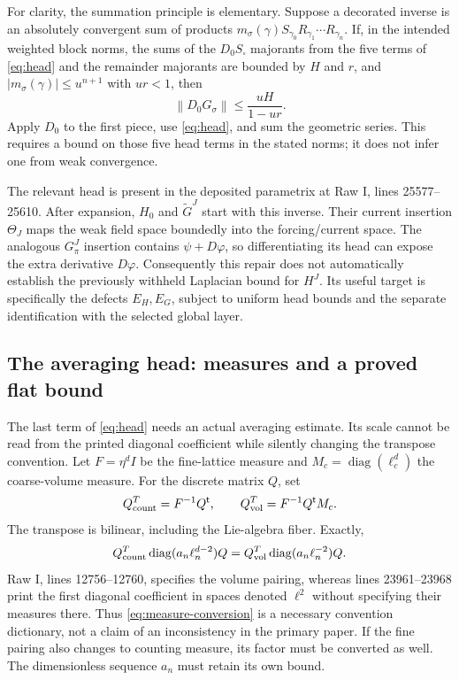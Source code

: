 \documentclass[11pt]{article}
\theoremstyle{remark}
\newcommand{\norm}[1]{\left\|#1\right\|}
\begin{document}
For clarity, the summation principle is elementary. Suppose a
decorated inverse is an absolutely convergent sum of products
$m_\sigma(\gamma)S_{\gamma_0}R_{\gamma_1}\cdots R_{\gamma_n}$.
If, in the intended weighted block norms, the sums of the
$D_0S_\square$ majorants from the five terms of \eqref{eq:head}
and the remainder majorants are bounded by $H$ and $r$,
and $|m_\sigma(\gamma)|\le u^{n+1}$ with $ur<1$, then
\[
 \norm{D_0G_\sigma}\le\frac{uH}{1-ur}.
\]
Apply $D_0$ to the first piece, use \eqref{eq:head}, and sum the
geometric series. This requires a bound on those five head terms
in the stated norms; it does not infer one from weak convergence.

The relevant head is present in the deposited parametrix at Raw I,
lines 25577--25610. After expansion, $H_0$ and $\widetilde G^J$
start with this inverse. Their current insertion $\Theta_J$ maps the
weak field space boundedly into the forcing/current space. The analogous
$G_\pi^J$ insertion contains $\psi+D\varphi$, so differentiating its
head can expose the extra derivative $D\varphi$. Consequently this
repair does not automatically establish the previously withheld
Laplacian bound for $H^J$. Its useful target is specifically the
defects $E_H,E_G$, subject to uniform head bounds and the separate
identification with the selected global layer.

\subsection{The averaging head: measures and a proved flat bound}

The last term of \eqref{eq:head} needs an actual averaging estimate.
Its scale cannot be read from the printed diagonal coefficient while
silently changing the transpose convention. Let $F=\eta^d I$ be the
fine-lattice measure and $M_c=\operatorname{diag}(\ell_c^d)$ the
coarse-volume measure. For the discrete matrix $Q$, set
\[
 Q^T_{\rm count}=F^{-1}Q^{\mathsf t},\qquad
 Q^T_{\rm vol}=F^{-1}Q^{\mathsf t}M_c.
\]
The transpose is bilinear, including the Lie-algebra fiber. Exactly,
\begin{equation}\label{eq:measure-conversion}
 Q^T_{\rm count}\operatorname{diag}(a_n\ell_n^{d-2})Q
 =Q^T_{\rm vol}\operatorname{diag}(a_n\ell_n^{-2})Q.
\end{equation}
Raw I, lines 12756--12760, specifies the volume pairing, whereas
lines 23961--23968 print the first diagonal coefficient in spaces
denoted $\ell^2$ without specifying their measures there. Thus
\eqref{eq:measure-conversion} is a necessary convention dictionary,
not a claim of an inconsistency in the primary paper. If the fine
pairing also changes to counting measure, its factor must be converted
as well. The dimensionless sequence $a_n$ must retain its own bound.
\end{document}
